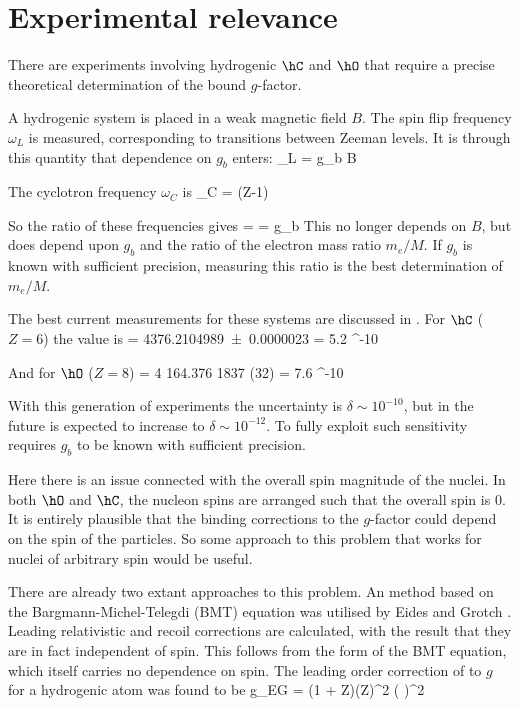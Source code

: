 \section{Experimental relevance}
There are experiments involving hydrogenic $\hC$ and $\hO$ that require a precise theoretical determination of the bound $g$-factor.


A hydrogenic system is placed in a weak magnetic field $B$.  The spin flip frequency $\omega_L$ is measured, corresponding to transitions between Zeeman levels.  It is through this quantity that dependence on $g_b$ enters:
\beq
	\omega_L = g_b  B
\eeq

The cyclotron frequency $\omega_C$ is
\beq
	\omega_C = (Z-1) 
\eeq

So the ratio of these frequencies gives
\beq
	 =  = 
	g_b  
\eeq
This no longer depends on $B$, but does depend upon $g_b$ and the ratio of the electron mass ratio $m_e/M$.  If $g_b$ is known with sufficient precision, measuring this ratio is the best determination of $m_e/M$.

The best current measurements for these systems are discussed in \cite{2006IJMSp.251..152W}.  For $\hC$ ($Z=6$) the value is
\beq
	  = \num{4376.2104989(23)}	\hspace{3em} 	\delta= 5.2 ^{-10}
\eeq

And for $\hO$ ($Z=8$)
\beq
		  = \num{4 164.376 1837 (32)} \hspace{3em} \delta= 7.6 ^{-10}
\eeq

With this generation of experiments the uncertainty is $\delta \sim 10^{-10}$, but in the future is expected to increase to $\delta \sim 10^{-12}$.  To fully exploit such sensitivity requires $g_b$ to be known with sufficient precision.

Here there is an issue connected with the overall spin magnitude of the nuclei.  In both $\hO$ and $\hC$, the nucleon spins are arranged such that the overall spin is $0$.  It is entirely plausible that the binding corrections to the $g$-factor could depend on the spin of the particles.  So some approach to this problem that works for nuclei of arbitrary spin would be useful.


There are already two extant approaches to this problem.  An method based on the Bargmann-Michel-Telegdi (BMT) equation was utilised by Eides and Grotch \cite{Eides:1997sq}.  Leading relativistic and recoil corrections are calculated, with the result that they are in fact independent of spin.  This follows from the form of the BMT equation, which itself carries no dependence on spin.  The leading order correction of to $g$ for a hydrogenic atom was found to be
\beq
	\Delta g_{EG} = (1 + Z)(Z\alpha)^2 \left(  \right )^2
\eeq 

